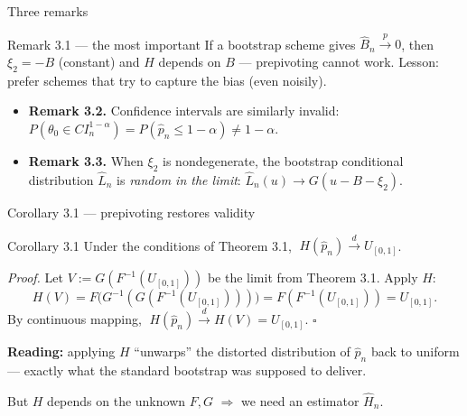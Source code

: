 \documentclass[10pt,aspectratio=169]{beamer}
\theoremstyle{plain}
\newcommand{\dto}{\xrightarrow{d}}
\newcommand{\pto}{\xrightarrow{p}}
\newcommand{\Bnh}{\hat{B}_{n}}
\newcommand{\pnh}{\hat{p}_{n}}
\newcommand{\Hnh}{\hat{H}_{n}}
\newcommand{\Lnh}{\hat{L}_{n}}
\begin{document}

\begin{frame}{Three remarks}

  \begin{alertblock}{Remark 3.1 --- the most important}
    If a bootstrap scheme gives $\Bnh \pto 0$, then $\xi_2 = -B$ (constant)
    and $H$ \alert{depends on $B$} --- prepivoting cannot work.
    Lesson: prefer schemes that try to capture the bias (even noisily).
  \end{alertblock}

  \bigskip

  \begin{itemize}
    \setlength{\itemsep}{6pt}
    \item \textbf{Remark 3.2.} Confidence intervals are similarly invalid:
      $P(\theta_0 \in CI^{1-\alpha}_n) = P(\pnh \le 1-\alpha) \neq 1-\alpha$.
    \item \textbf{Remark 3.3.} When $\xi_2$ is nondegenerate, the bootstrap conditional
      distribution $\Lnh$ is \textit{random in the limit}: $\Lnh(u) \to G(u - B - \xi_2)$.
  \end{itemize}

\end{frame}


\begin{frame}{Corollary 3.1 --- prepivoting restores validity}


  \medskip

  \begin{block}{Corollary 3.1}
    Under the conditions of Theorem 3.1, $\;H(\pnh) \dto U_{[0,1]}$.
  \end{block}

  \medskip

  \textit{Proof.} Let $V := G(F^{-1}(U_{[0,1]}))$ be the limit from Theorem 3.1.
  Apply $H$:
  \[
    H(V) = F\bigl(G^{-1}(G(F^{-1}(U_{[0,1]})))\bigr) = F(F^{-1}(U_{[0,1]})) = U_{[0,1]}.
  \]
  By continuous mapping, $\;H(\pnh) \dto H(V) = U_{[0,1]}$. \quad$\square$

  \medskip

  \textbf{Reading:} applying $H$ ``unwarps'' the distorted distribution of $\pnh$
  back to uniform --- exactly what the standard bootstrap was supposed to deliver.

  \medskip

  \alert{But $H$ depends on the unknown $F,G$ $\Longrightarrow$ we need an estimator $\Hnh$.}

\end{frame}
\end{document}
